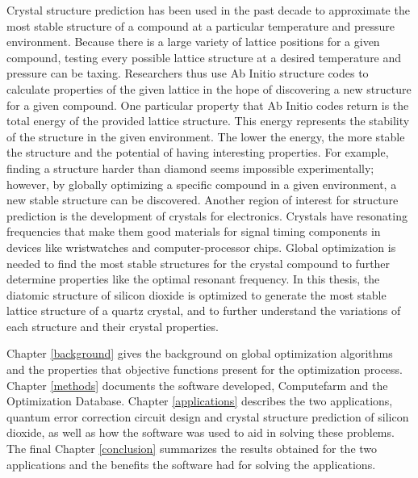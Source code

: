 Crystal structure prediction has been used in the past decade to approximate the most stable structure of a compound at a particular temperature and pressure environment. Because there is a large variety of lattice positions for a given compound, testing every possible lattice structure at a desired temperature and pressure can be taxing. Researchers thus use Ab Initio structure codes to calculate properties of the given lattice in the hope of discovering a new structure for a given compound. One particular property that Ab Initio codes return is the total energy of the provided lattice structure. This energy represents the stability of the structure in the given environment. The lower the energy, the more stable the structure and the potential of having interesting properties. For example, finding a structure harder than diamond seems impossible experimentally; however, by globally optimizing a specific compound in a given environment, a new stable structure can be discovered. Another region of interest for structure prediction is the development of crystals for electronics. Crystals have resonating frequencies that make them good materials for signal timing components in devices like wristwatches and computer-processor chips. Global optimization is needed to find the most stable structures for the crystal compound to further determine properties like the optimal resonant frequency. In this thesis, the diatomic structure of silicon dioxide is optimized to generate the most stable lattice structure of a quartz crystal, and to further understand the variations of each structure and their crystal properties. 

Chapter \ref{background} gives the background on global optimization algorithms and the properties that objective functions present for the optimization process. Chapter \ref{methods} documents the software developed, Computefarm and the Optimization Database. Chapter \ref{applications} describes the two applications, quantum error correction circuit design and crystal structure prediction of silicon dioxide, as well as how the software was used to aid in
solving these problems. The final Chapter \ref{conclusion} summarizes the results obtained for the two applications and the benefits the software had for solving the applications.

